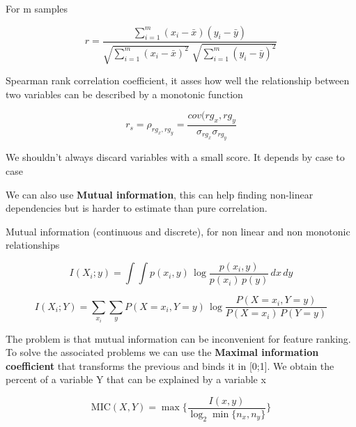 For m samples

\begin{equation*}
r = \frac{\sum_{i=1}^{m} (x_i - \bar{x})(y_i - \bar{y})}
{\sqrt{\sum_{i=1}^{m} (x_i - \bar{x})^2} \; \sqrt{\sum_{i=1}^{m} (y_i - \bar{y})^2}}
\end{equation*}

Spearman rank correlation coefficient, it asses how well the relationship between two variables can be described by a monotonic function

\begin{equation*}
    r_s = \rho_{rg_x,rg_y}= \frac{cov(rg_x,rg_y}{\sigma_{rg_x}\sigma_{rg_y}}
\end{equation*}

\vspace{10pt}

We shouldn't always discard variables with a small score. It depends by case to case

\vspace{10pt}

We can also use \textbf{Mutual information}, this can help finding non-linear dependencies but is harder to estimate than pure correlation.

\vspace{10pt}

Mutual information (continuous and discrete), for non linear and non monotonic relationships

\begin{equation*}
I(X_i; y) = \int \int p(x_i, y) \, \log \frac{p(x_i, y)}{p(x_i)\, p(y)} \, dx \, dy
\end{equation*}

\begin{equation*}
I(X_i; Y) = \sum_{x_i} \sum_{y} P(X = x_i, Y = y) \, \log \frac{P(X = x_i, Y = y)}{P(X = x_i) \, P(Y = y)}
\end{equation*}

The problem is that mutual information can be inconvenient for feature ranking. To solve the associated problems we can use the \textbf{Maximal information coefficient} that transforms the previous and binds it in [0;1]. We obtain the percent of a variable Y that can be explained by a variable x

\begin{equation*}
\text{MIC}(X, Y) = \max \{\frac{I(x, y)}{\log_2 \min\{ n_x, n_y \}}\}
\end{equation*}

\vspace{10pt}

